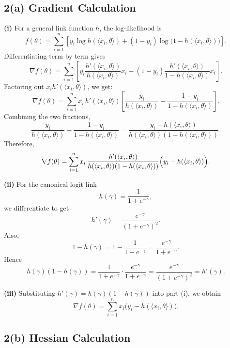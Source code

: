 \documentclass{article}
\begin{document}
\subsection*{2(a) Gradient Calculation}

\textbf{(i)} For a general link function \(h\), the log-likelihood is
\[
f(\theta)=\sum_{i=1}^n \left[y_i \log h(\langle x_i,\theta\rangle)+(1-y_i)\log\bigl(1-h(\langle x_i,\theta\rangle)\bigr)\right].
\]
Differentiating term by term gives
\[
\nabla f(\theta)
=
\sum_{i=1}^n
\left[
y_i \frac{h'(\langle x_i,\theta\rangle)}{h(\langle x_i,\theta\rangle)}x_i
-
(1-y_i)\frac{h'(\langle x_i,\theta\rangle)}{1-h(\langle x_i,\theta\rangle)}x_i
\right].
\]
Factoring out \(x_i h'(\langle x_i,\theta\rangle)\), we get:
\[
\nabla f(\theta)
=
\sum_{i=1}^n
x_i\,h'(\langle x_i,\theta\rangle)
\left[
\frac{y_i}{h(\langle x_i,\theta\rangle)}
-
\frac{1-y_i}{1-h(\langle x_i,\theta\rangle)}
\right].
\]
Combining the two fractions,
\[
\frac{y_i}{h(\langle x_i,\theta\rangle)}
-
\frac{1-y_i}{1-h(\langle x_i,\theta\rangle)}
=
\frac{y_i-h(\langle x_i,\theta\rangle)}
{h(\langle x_i,\theta\rangle)(1-h(\langle x_i,\theta\rangle))}.
\]
Therefore,
\[
\nabla f(\theta)
=
\sum_{i=1}^n
x_i\,
\frac{h'(\langle x_i,\theta\rangle)}
{h(\langle x_i,\theta\rangle)(1-h(\langle x_i,\theta\rangle))}
\Bigl(y_i-h(\langle x_i,\theta\rangle)\Bigr).
\]

\textbf{(ii)} For the canonical logit link
\[
h(\gamma)=\frac{1}{1+e^{-\gamma}},
\]
we differentiate to get
\[
h'(\gamma)=\frac{e^{-\gamma}}{(1+e^{-\gamma})^2}.
\]
Also,
\[
1-h(\gamma)=1-\frac{1}{1+e^{-\gamma}}
=\frac{e^{-\gamma}}{1+e^{-\gamma}}.
\]
Hence
\[
h(\gamma)(1-h(\gamma))
=
\frac{1}{1+e^{-\gamma}}
\cdot
\frac{e^{-\gamma}}{1+e^{-\gamma}}
=
\frac{e^{-\gamma}}{(1+e^{-\gamma})^2}
=
h'(\gamma).
\]

\textbf{(iii)} Substituting \(h'(\gamma)=h(\gamma)(1-h(\gamma))\) into part (i), we obtain
\[
\nabla f(\theta)
=
\sum_{i=1}^n
x_i \bigl(y_i-h(\langle x_i,\theta\rangle)\bigr).
\]

\subsection*{2(b) Hessian Calculation}
\end{document}
